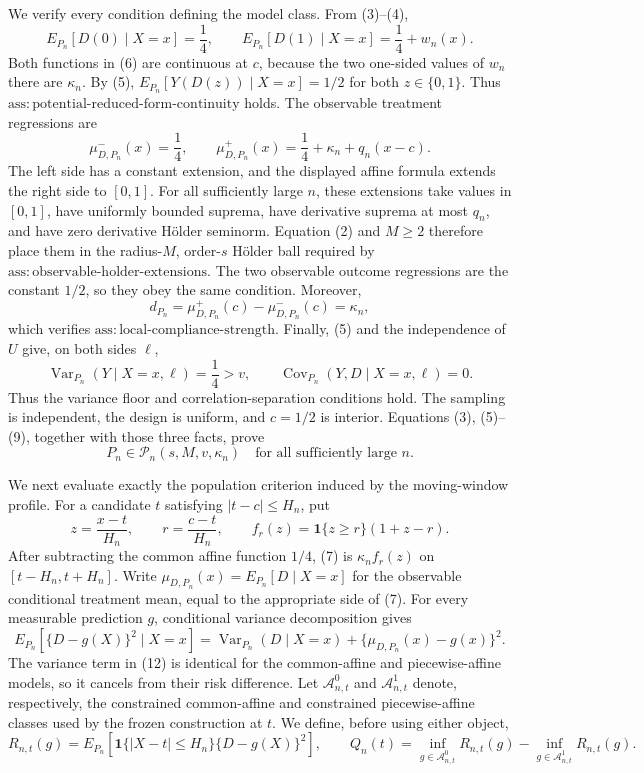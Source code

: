 We verify every condition defining the model class.  From (3)--(4),
\[
 E_{P_n}[D(0)\mid X=x]=\frac14,
 \qquad
 E_{P_n}[D(1)\mid X=x]=\frac14+w_n(x).
 \tag{6}
\]
Both functions in (6) are continuous at \(c\), because the two
one-sided values of \(w_n\) there are \(\kappa_n\).  By (5),
\(E_{P_n}[Y(D(z))\mid X=x]=1/2\) for both \(z\in\{0,1\}\).  Thus
\(\mathrm{ass:potential\mbox{-}reduced\mbox{-}form\mbox{-}continuity}\)
holds.  The observable treatment regressions are
\[
 \mu_{D,P_n}^{-}(x)=\frac14,
 \qquad
 \mu_{D,P_n}^{+}(x)=\frac14+\kappa_n+q_n(x-c).
 \tag{7}
\]
The left side has a constant extension, and the displayed affine
formula extends the right side to \([0,1]\).  For all sufficiently
large \(n\), these extensions take values in \([0,1]\), have uniformly
bounded suprema, have derivative suprema at most \(q_n\), and have
zero derivative H\"older seminorm.  Equation (2) and \(M\ge2\)
therefore place them in the radius-\(M\), order-\(s\) H\"older ball
required by
\(\mathrm{ass:observable\mbox{-}holder\mbox{-}extensions}\).  The two
observable outcome regressions are the constant \(1/2\), so they obey
the same condition.  Moreover,
\[
 d_{P_n}=\mu_{D,P_n}^{+}(c)-\mu_{D,P_n}^{-}(c)=\kappa_n,
 \tag{8}
\]
which verifies \(\mathrm{ass:local\mbox{-}compliance\mbox{-}strength}\).
Finally, (5) and the independence of \(U\) give, on both sides
\(\ell\),
\[
 \operatorname{Var}_{P_n}(Y\mid X=x,\ell)=\frac14>v,
 \qquad
 \operatorname{Cov}_{P_n}(Y,D\mid X=x,\ell)=0.
 \tag{9}
\]
Thus the variance floor and correlation-separation conditions hold.
The sampling is independent, the design is uniform, and \(c=1/2\) is
interior.  Equations (3), (5)--(9), together with those three facts,
prove
\[
 P_n\in\mathcal P_n(s,M,v,\kappa_n)
 \quad\text{for all sufficiently large }n.
 \tag{10}
\]

We next evaluate exactly the population criterion induced by the
moving-window profile.  For a candidate \(t\) satisfying
\(|t-c|\le H_n\), put
\[
 z=\frac{x-t}{H_n},
 \qquad
 r=\frac{c-t}{H_n},
 \qquad
 f_r(z)=\mathbf 1\{z\ge r\}(1+z-r).
 \tag{11}
\]
After subtracting the common affine function \(1/4\), (7) is
\(\kappa_nf_r(z)\) on \([t-H_n,t+H_n]\).  Write
\(\mu_{D,P_n}(x)=E_{P_n}[D\mid X=x]\) for the observable conditional
treatment mean, equal to the appropriate side of (7).  For every measurable
prediction \(g\), conditional variance decomposition gives
\[
E_{P_n}[\{D-g(X)\}^2\mid X=x]
=\operatorname{Var}_{P_n}(D\mid X=x)
 +\{\mu_{D,P_n}(x)-g(x)\}^2.
\tag{12}
\]
The variance term in (12) is identical for the common-affine and
piecewise-affine models, so it cancels from their risk difference.
Let \(\mathcal A_{n,t}^0\) and \(\mathcal A_{n,t}^1\) denote,
respectively, the constrained common-affine and constrained
piecewise-affine classes used by the frozen construction at \(t\).  We
define, before using either object,
\[
 R_{n,t}(g)=E_{P_n}\!\left[
   \mathbf 1\{|X-t|\le H_n\}\{D-g(X)\}^2\right],
 \qquad
 Q_n(t)=\inf_{g\in\mathcal A_{n,t}^0}R_{n,t}(g)
       -\inf_{g\in\mathcal A_{n,t}^1}R_{n,t}(g).
\]

